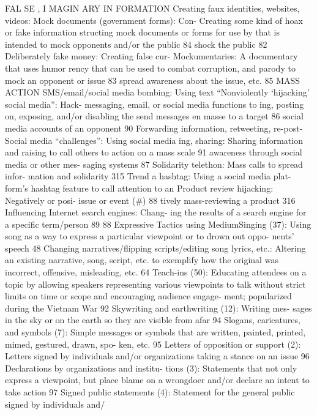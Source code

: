 \documentclass[twoside,a4paper,12pt,fleqn,openany]{extbook}
\begin{document}
FAL SE , I MAGIN ARY IN FORMATION
Creating faux identities, websites, videos:
 Mock documents (government forms): Con-
Creating some kind of hoax or fake information
 structing mock documents or forms for use by
that is intended to mock opponents and/or
 the public
 84
shock the public
 82
Deliberately fake money: Creating false cur-
Mockumentaries: A documentary that uses humor
 rency that can be used to combat corruption,
and parody to mock an opponent or issue 83
 spread awareness about the issue, etc.
 85
MASS ACTION
SMS/email/social media bombing: Using text
 “Nonviolently ‘hijacking’ social media”: Hack-
messaging, email, or social media functions to
 ing, posting on, exposing, and/or disabling the
send messages en masse to a target
 86
 social media accounts of an opponent
 90
Forwarding information, retweeting, re-post-
 Social media “challenges”: Using social media
ing, sharing: Sharing information and raising
 to call others to action on a mass scale
 91
awareness through social media or other mes-
saging systems
 87
 Solidarity telethon: Mass calls to spread infor-
mation and solidarity
 315
Trend a hashtag: Using a social media plat-
form’s hashtag feature to call attention to an
 Product review hijacking: Negatively or posi-
issue or event (#)
 88
 tively mass-reviewing a product
 316
Influencing Internet search engines: Chang-
ing the results of a search engine for a specific
term/person
 89
88
Expressive Tactics using MediumSinging (37): Using song as a way to express
a particular viewpoint or to drown out oppo-
nents’ speech
 48
Changing narratives/flipping scripts/editing
song lyrics, etc.: Altering an existing narrative,
song, script, etc. to exemplify how the original
was incorrect, offensive, misleading, etc. 64
Teach-ins (50): Educating attendees on a topic
by allowing speakers representing various
viewpoints to talk without strict limits on time
or scope and encouraging audience engage-
ment; popularized during the Vietnam War 92
Skywriting and earthwriting (12): Writing mes-
sages in the sky or on the earth so they are
visible from afar
 94
Slogans, caricatures, and symbols (7):
Simple messages or symbols that are written,
painted, printed, mimed, gestured, drawn, spo-
ken, etc.
 95
Letters of opposition or support (2): Letters
signed by individuals and/or organizations
taking a stance on an issue
 96
Declarations by organizations and institu-
tions (3): Statements that not only express a
viewpoint, but place blame on a wrongdoer
and/or declare an intent to take action
 97
Signed public statements (4): Statement for
the general public signed by individuals and/
\end{document}

